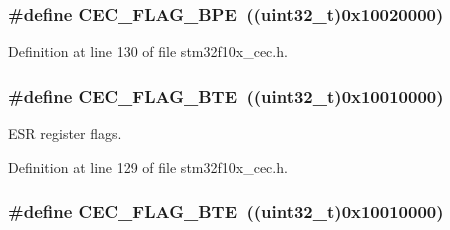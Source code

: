 \subsubsection[{\texorpdfstring{C\+E\+C\+\_\+\+F\+L\+A\+G\+\_\+\+B\+PE}{CEC_FLAG_BPE}}]{\setlength{\rightskip}{0pt plus 5cm}\#define C\+E\+C\+\_\+\+F\+L\+A\+G\+\_\+\+B\+PE~(({\bf uint32\+\_\+t})0x10020000)}\hypertarget{group___c_e_c__flags__definition_gaf2a5d5dcbc57fc0cf7cfa988533a2a09}{}\label{group___c_e_c__flags__definition_gaf2a5d5dcbc57fc0cf7cfa988533a2a09}


Definition at line 130 of file stm32f10x\+\_\+cec.\+h.

\subsubsection[{\texorpdfstring{C\+E\+C\+\_\+\+F\+L\+A\+G\+\_\+\+B\+TE}{CEC_FLAG_BTE}}]{\setlength{\rightskip}{0pt plus 5cm}\#define C\+E\+C\+\_\+\+F\+L\+A\+G\+\_\+\+B\+TE~(({\bf uint32\+\_\+t})0x10010000)}\hypertarget{group___c_e_c__flags__definition_ga66e91438a7df5d00db3c5410d8f7d456}{}\label{group___c_e_c__flags__definition_ga66e91438a7df5d00db3c5410d8f7d456}


E\+SR register flags. 



Definition at line 129 of file stm32f10x\+\_\+cec.\+h.

\subsubsection[{\texorpdfstring{C\+E\+C\+\_\+\+F\+L\+A\+G\+\_\+\+B\+TE}{CEC_FLAG_BTE}}]{\setlength{\rightskip}{0pt plus 5cm}\#define C\+E\+C\+\_\+\+F\+L\+A\+G\+\_\+\+B\+TE~(({\bf uint32\+\_\+t})0x10010000)}\hypertarget{group___c_e_c__flags__definition_ga66e91438a7df5d00db3c5410d8f7d456}{}\label{group___c_e_c__flags__definition_ga66e91438a7df5d00db3c5410d8f7d456}


